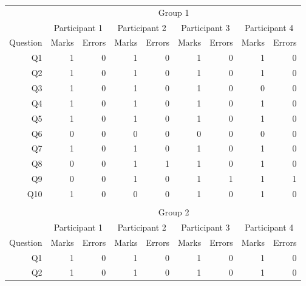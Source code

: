 \documentclass[12pt,twoside,notitlepage,xetex]{report}
\begin{document}
{\begin{center}
\begin{table}[H]
\begin{center}
\begin{tabular}{|r||r|r||r|r||r|r||r|r|}
\cline{2-9}
\multicolumn{1}{c|}{} & \multicolumn{8}{c|}{Group 1}\\ \cline{2-9}
\multicolumn{1}{c|}{} & \multicolumn{2}{c||}{Participant 1} & \multicolumn{2}{c||}{Participant 2} & \multicolumn{2}{c||}{Participant 3} & \multicolumn{2}{c|}{Participant 4}\\ \hline
\multicolumn{1}{|c||}{Question} & \multicolumn{1}{c|}{Marks} & \multicolumn{1}{c||}{Errors} & \multicolumn{1}{c|}{Marks} & \multicolumn{1}{c||}{Errors} & \multicolumn{1}{c|}{Marks} & \multicolumn{1}{c||}{Errors} & \multicolumn{1}{c|}{Marks} & \multicolumn{1}{c|}{Errors}\\ \hline \hline
Q1 & 1 & 0 & 1 & 0 & 1 & 0 & 1 & 0\\ \hline
Q2 & 1 & 0 & 1 & 0 & 1 & 0 & 1 & 0\\ \hline
Q3 & 1 & 0 & 1 & 0 & 1 & 0 & 0 & 0\\ \hline
Q4 & 1 & 0 & 1 & 0 & 1 & 0 & 1 & 0\\ \hline
Q5 & 1 & 0 & 1 & 0 & 1 & 0 & 1 & 0\\ \hline
Q6 & 0 & 0 & 0 & 0 & 0 & 0 & 0 & 0\\ \hline
Q7 & 1 & 0 & 1 & 0 & 1 & 0 & 1 & 0\\ \hline
Q8 & 0 & 0 & 1 & 1 & 1 & 0 & 1 & 0\\ \hline
Q9 & 0 & 0 & 1 & 0 & 1 & 1 & 1 & 1\\ \hline
Q10 & 1 & 0 & 0 & 0 & 1 & 0 & 1 & 0\\ \hline
\multicolumn{9}{c}{}\\ \cline{2-9}
\multicolumn{1}{c|}{} & \multicolumn{8}{c|}{Group 2}\\ \cline{2-9}
\multicolumn{1}{c|}{} & \multicolumn{2}{c||}{Participant 1} & \multicolumn{2}{c||}{Participant 2} & \multicolumn{2}{c||}{Participant 3} & \multicolumn{2}{c|}{Participant 4}\\ \hline
\multicolumn{1}{|c||}{Question} & \multicolumn{1}{c|}{Marks} & \multicolumn{1}{c||}{Errors} & \multicolumn{1}{c|}{Marks} & \multicolumn{1}{c||}{Errors} & \multicolumn{1}{c|}{Marks} & \multicolumn{1}{c||}{Errors} & \multicolumn{1}{c|}{Marks} & \multicolumn{1}{c|}{Errors}\\ \hline \hline
Q1 & 1 & 0 & 1 & 0 & 1 & 0 & 1 & 0\\ \hline
Q2 & 1 & 0 & 1 & 0 & 1 & 0 & 1 & 0\\ \hline

\end{tabular}
\end{center}
\end{table}
\end{center}}
\end{document}
